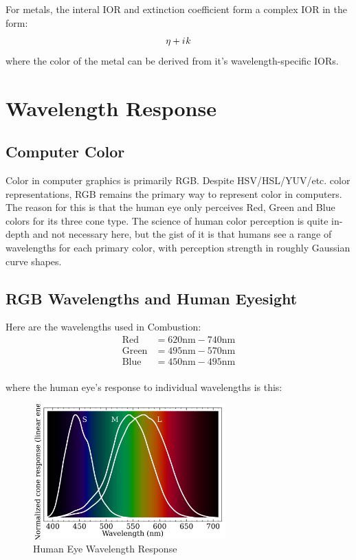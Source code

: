 \documentclass[12pt,letterpaper]{article}
\newcommand{\iu}{{i\mkern1mu}}
\begin{document}
For metals, the interal IOR and extinction coefficient form a complex IOR in the form:
$$\eta + \iu k$$
where the color of the metal can be derived from it's wavelength-specific IORs.

\newpage

\section{Wavelength Response}

\subsection{Computer Color}

Color in computer graphics is primarily RGB. Despite HSV/HSL/YUV/etc. color representations, RGB remains the primary way to 
represent color in computers. The reason for this is that the human eye only perceives Red, Green and Blue colors for its three cone type.
The science of human color perception is quite in-depth and not necessary here, but the gist of it is that humans see a range of wavelengths
for each primary color, with perception strength in roughly Gaussian curve shapes.

\subsection{RGB Wavelengths and Human Eyesight}

Here are the wavelengths used in Combustion:
\begin{align*}
    \text{Red}   &= 620\text{nm} - 740\text{nm}\\
    \text{Green} &= 495\text{nm} - 570\text{nm}\\
    \text{Blue}  &= 450\text{nm} - 495\text{nm}\\
\end{align*}

where the human eye's response to individual wavelengths is this:
\begin{figure}[htbp]
    \centering
    \includegraphics[width=20em]{Cone-fundamentals-with-srgb-spectrum}
    \caption{Human Eye Wavelength Response}
    \label{fig:eye_wavelength_response}
\end{figure}
\end{document}
